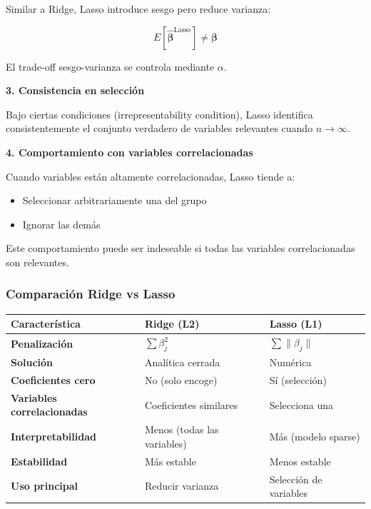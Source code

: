 \documentclass[
  doc,
  floatsintext,
  longtable,
  a4paper,
  nolmodern,
  notxfonts,
  notimes,
  12pt,
  colorlinks=true,linkcolor=blue,citecolor=blue,urlcolor=blue]{apa7}
\providecommand{\tightlist}{%
  \setlength{\itemsep}{0pt}\setlength{\parskip}{0pt}}
\newcounter{none} %
\begin{document}
Similar a Ridge, Lasso introduce sesgo pero reduce varianza:

\[
E[\hat{\boldsymbol{\beta}}^{\text{Lasso}}] \neq \boldsymbol{\beta}
\]

El trade-off sesgo-varianza se controla mediante \(\alpha\).

\textbf{3. Consistencia en selección}

Bajo ciertas condiciones (irrepresentability condition), Lasso
identifica consistentemente el conjunto verdadero de variables
relevantes cuando \(n \to \infty\).

\textbf{4. Comportamiento con variables correlacionadas}

Cuando variables están altamente correlacionadas, Lasso tiende a:

\begin{itemize}
\tightlist
\item
  Seleccionar arbitrariamente una del grupo
\item
  Ignorar las demás
\end{itemize}

Este comportamiento puede ser indeseable si todas las variables
correlacionadas son relevantes.

\subsubsection{Comparación Ridge vs
Lasso}\label{comparaciuxf3n-ridge-vs-lasso}

{\def\LTcaptype{none} %
\begin{longtable}[]{@{}
  >{\raggedright\arraybackslash}p{}
  >{\raggedright\arraybackslash}p{}
  >{\raggedright\arraybackslash}p{}@{}}
\toprule\noalign{}
\begin{minipage}[b]{\linewidth}\raggedright
Característica
\end{minipage} & \begin{minipage}[b]{\linewidth}\raggedright
Ridge (L2)
\end{minipage} & \begin{minipage}[b]{\linewidth}\raggedright
Lasso (L1)
\end{minipage} \\
\midrule\noalign{}
\endhead
\bottomrule\noalign{}
\endlastfoot
\textbf{Penalización} & \(\sum \beta_j^2\) & \(\sum \|\beta_j\|\) \\
\textbf{Solución} & Analítica cerrada & Numérica \\
\textbf{Coeficientes cero} & No (solo encoge) & Sí (selección) \\
\textbf{Variables correlacionadas} & Coeficientes similares & Selecciona
una \\
\textbf{Interpretabilidad} & Menos (todas las variables) & Más (modelo
sparse) \\
\textbf{Estabilidad} & Más estable & Menos estable \\
\textbf{Uso principal} & Reducir varianza & Selección de variables \\
\end{longtable}
}
\end{document}
